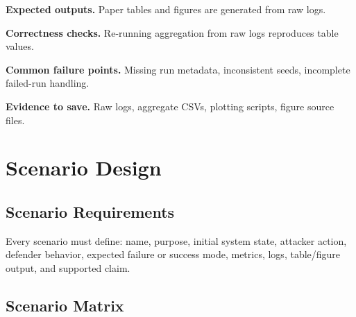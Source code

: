 \documentclass[11pt,oneside]{report}
\begin{document}
\textbf{Expected outputs.} Paper tables and figures are generated from raw logs.

\textbf{Correctness checks.} Re-running aggregation from raw logs reproduces table values.

\textbf{Common failure points.} Missing run metadata, inconsistent seeds, incomplete failed-run
handling.

\textbf{Evidence to save.} Raw logs, aggregate CSVs, plotting scripts, figure source files.

\chapter{Scenario Design}

\section{Scenario Requirements}

Every scenario must define: name, purpose, initial system state, attacker action, defender behavior,
expected failure or success mode, metrics, logs, table/figure output, and supported claim.

\section{Scenario Matrix}
\end{document}
